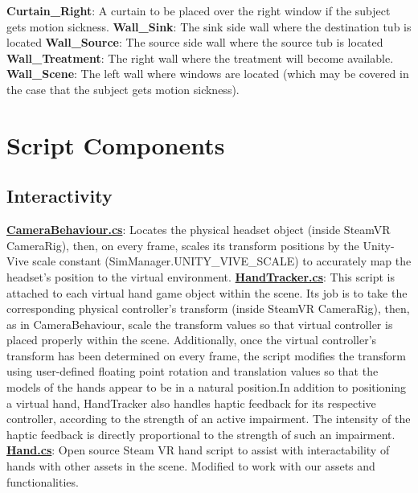 \documentclass{article}
\begin{document}
\textbf{Curtain\_Right}: A curtain to be placed over the right window if the subject gets motion sickness. \newline \newline
\textbf{Wall\_Sink}: The sink side wall where the destination tub is located \newline \newline
\textbf{Wall\_Source}: The source side wall where the source tub is located  \newline \newline
\textbf{Wall\_Treatment}: The right wall where the treatment will become available.
\textbf{Wall\_Scene}: The left wall where windows are located (which may be covered in the case that the subject gets motion sickness).

\section{Script Components}
\subsection{Interactivity} 
\href{https://bit.ly/2JH9ws0}{\textbf{CameraBehaviour.cs}}: Locates the physical headset object (inside SteamVR CameraRig), then, on every frame, scales its transform positions by the Unity-Vive scale constant (SimManager.UNITY\_VIVE\_SCALE) to accurately map the headset's position to the virtual environment. \newline \newline
\href{https://bit.ly/2U3xT7n}{\textbf{HandTracker.cs}}: This script is attached to each virtual hand game object within the scene. Its job is to take the corresponding physical controller's transform (inside SteamVR CameraRig), then, as in CameraBehaviour, scale the transform values so that virtual controller is placed properly within the scene. Additionally, once the virtual controller's transform has been determined on every frame, the script modifies the transform using user-defined floating point rotation and translation values so that the models of the hands appear to be in a natural position.\newline In addition to positioning a virtual hand, HandTracker also handles haptic feedback for its respective controller, according to the strength of an active impairment. The intensity of the haptic feedback is directly proportional to the strength of such an impairment. \newline \newline
\href{}{\textbf{Hand.cs}}: Open source Steam VR hand script to assist with interactability of hands with other assets in the scene. Modified to work with our assets and functionalities.
\end{document}
